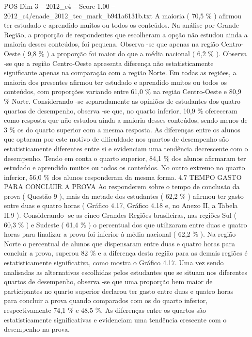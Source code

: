 \begin{textsample}{POS Dim 3 – 2012\_c4 – Score 1.00 – 2012\_c4/enade\_2012\_tec\_mark\_b941a6131b.txt}
A maioria ( 70,5 \% ) afirmou ter estudado e aprendido muitos ou todos os conteúdos.
Na análise por Grande Região, a proporção de respondentes que escolheram a opção não estudou ainda a maioria desses conteúdos, foi pequena.
Observa -se que apenas na região Centro-Oeste ( 9,8 \% ) a proporção foi maior do que a média nacional ( 6,2 \% ).
Observa -se que a região Centro-Oeste apresenta diferença não estatisticamente significante apenas na comparação com a região Norte.
Em todas as regiões, a maioria dos presentes afirmou ter estudado e aprendido muitos ou todos os conteúdos, com proporções variando entre 61,0 \% na região Centro-Oeste e 80,9 \% Norte.
Considerando -se separadamente as opiniões de estudantes dos quatro quartos de desempenho, observa -se que, no quarto inferior, 10,9 \% ofereceram como resposta que não estudou ainda a maioria desses conteúdos, sendo menos de 3 \% os do quarto superior com a mesma resposta.
As diferenças entre os alunos que optaram por este motivo de dificuldade nos quartos de desempenho são estatisticamente diferentes entre si e evidenciam uma tendência decrescente com o desempenho.
Tendo em conta o quarto superior, 84,1 \% dos alunos afirmaram ter estudado e aprendido muitos ou todos os conteúdos.
No outro extremo no quarto inferior, 56,0 \% dos alunos responderam da mesma forma. 4.7 TEMPO GASTO PARA CONCLUIR A PROVA Ao responderem sobre o tempo de conclusão da prova ( Questão 9 ), mais da metade dos estudantes ( 62,2 \% ) afirmou ter gasto entre duas e quatro horas ( Gráfico 4.17, Gráfico 4.18 e, no Anexo II, a Tabela II.9 ).
Considerando -se as cinco Grandes Regiões brasileiras, nas regiões Sul ( 60,3 \% ) e Sudeste ( 61,4 \% ) o percentual dos que utilizaram entre duas e quatro horas para finalizar a prova foi inferior à média nacional ( 62,2 \% ).
Na região Norte o percentual de alunos que dispensaram entre duas e quatro horas para concluir a prova, superou 82 \% e a diferença desta região para as demais regiões é estatisticamente significativa, como mostra o Gráfico 4.17.
Uma vez sendo analisadas as alternativas escolhidas pelos estudantes que se situam nos diferentes quartos de desempenho, observa -se que uma proporção bem maior de participantes no quarto superior declarou ter gasto entre duas e quatro horas para concluir a prova quando comparados com os do quarto inferior, respectivamente 74,1 \% e 48,5 \%.
As diferenças entre os quartos são estatisticamente significativas e evidenciam uma tendência crescente com o desempenho na prova.

\end{textsample}
